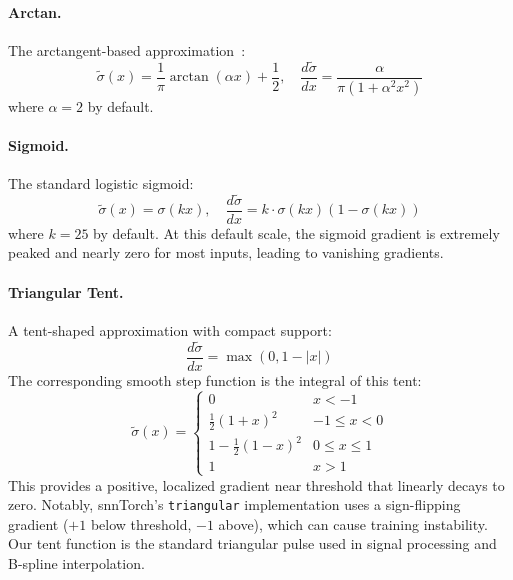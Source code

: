 \documentclass[11pt]{article}
\begin{document}
\paragraph{Arctan.}
The arctangent-based approximation~\citep{shrestha2018slayer}:
\begin{equation}
    \tilde{\sigma}(x) = \frac{1}{\pi}\arctan(\alpha x) + \frac{1}{2}, \quad \frac{d\tilde{\sigma}}{dx} = \frac{\alpha}{\pi(1 + \alpha^2 x^2)}
    \label{eq:arctan}
\end{equation}
where $\alpha=2$ by default.

\paragraph{Sigmoid.}
The standard logistic sigmoid:
\begin{equation}
    \tilde{\sigma}(x) = \sigma(kx), \quad \frac{d\tilde{\sigma}}{dx} = k \cdot \sigma(kx)(1 - \sigma(kx))
    \label{eq:sigmoid}
\end{equation}
where $k=25$ by default. At this default scale, the sigmoid gradient is extremely peaked and nearly zero for most inputs, leading to vanishing gradients.

\paragraph{Triangular Tent.}
A tent-shaped approximation with compact support:
\begin{equation}
    \frac{d\tilde{\sigma}}{dx} = \max(0, 1 - |x|)
    \label{eq:triangular}
\end{equation}
The corresponding smooth step function is the integral of this tent:
\begin{equation}
    \tilde{\sigma}(x) = \begin{cases}
        0 & x < -1 \\
        \frac{1}{2}(1+x)^2 & -1 \leq x < 0 \\
        1 - \frac{1}{2}(1-x)^2 & 0 \leq x \leq 1 \\
        1 & x > 1
    \end{cases}
    \label{eq:triangular_approx}
\end{equation}
This provides a positive, localized gradient near threshold that linearly decays to zero. Notably, snnTorch's \texttt{triangular} implementation uses a sign-flipping gradient ($+1$ below threshold, $-1$ above), which can cause training instability. Our tent function is the standard triangular pulse used in signal processing and B-spline interpolation.
\end{document}
